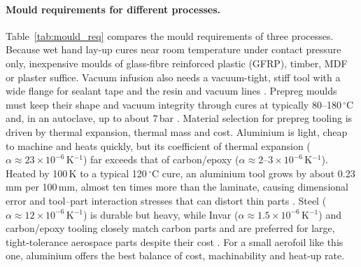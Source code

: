\documentclass[11pt,a4paper]{article}
\newenvironment{addedblock}{\color{addgreen}}{}
\newenvironment{addedblock}{}{}
\begin{document}
\begin{addedblock}
\paragraph{Mould requirements for different processes.}
Table~\ref{tab:mould_req} compares the mould requirements of three
processes. Because wet hand lay-up cures near room temperature under
contact pressure only, inexpensive moulds of glass-fibre reinforced
plastic (GFRP), timber, MDF or plaster suffice. Vacuum infusion also
needs a vacuum-tight, stiff tool with a wide flange for sealant tape
and the resin and vacuum lines \citep{williams1996}. Prepreg moulds
must keep their shape and vacuum integrity through cures at typically
80--180\,$^\circ$C and, in an autoclave, up to about 7\,bar
\citep{campbell2004,hexcel2013}. Material selection for prepreg
tooling is driven by thermal expansion, thermal mass and cost.
Aluminium is light, cheap to machine and heats quickly, but its
coefficient of thermal expansion ($\alpha \approx
23\times10^{-6}$\,K$^{-1}$) far exceeds that of carbon/epoxy ($\alpha
\approx 2$--$3\times10^{-6}$\,K$^{-1}$). Heated by 100\,K to a typical
120\,$^\circ$C cure, an aluminium tool grows by about 0.23\,mm per
100\,mm, almost ten times more than the laminate, causing dimensional
error and tool--part interaction stresses that can distort thin parts
\citep{twigg2004}. Steel ($\alpha \approx 12\times10^{-6}$\,K$^{-1}$)
is durable but heavy, while Invar ($\alpha \approx
1.5\times10^{-6}$\,K$^{-1}$) and carbon/epoxy tooling closely match
carbon parts and are preferred for large, tight-tolerance aerospace
parts despite their cost \citep{campbell2004}. For a small aerofoil
like this one, aluminium offers the best balance of cost,
machinability and heat-up rate.
\end{addedblock}
\end{document}
